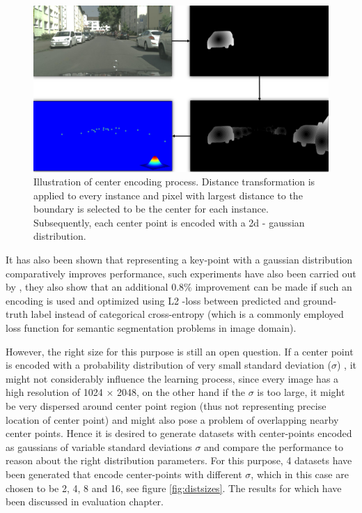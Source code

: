 \begin{figure}[!ht]
    \includegraphics[width = \textwidth]{Graphics/Data_Representation/dist_centerpoints.pdf}
    \caption[Center Encoding Process]{Illustration of center encoding process. Distance transformation is applied to every instance and pixel with largest distance to the boundary is selected to be the center for each instance. Subsequently, each center point is encoded with a 2d - gaussian distribution.}
    \label{fig:centerpoints}
\end{figure}

It has also been shown that representing a key-point with a gaussian distribution comparatively improves performance, such experiments have also been carried out by \cite{Cheng_2020_CVPR}, they also show that an additional $0.8\%$ improvement can be made if such an encoding is used and optimized using L2 -loss between predicted and ground-truth label instead of categorical cross-entropy (which is a commonly employed loss function for semantic segmentation problems in image domain). 

However, the right size for this purpose is still an open question. If a center point is encoded with a probability distribution of very small standard deviation ($\sigma$) , it might not considerably influence the learning process, since every image has a high resolution of 1024 $\times$ 2048, on the other hand if the $\sigma$ is too large, it might be very dispersed around center point region (thus not representing precise location of center point) and might also pose a problem of overlapping nearby center points. Hence it is desired to generate datasets with center-points encoded as gaussians of variable standard deviations $\sigma$ and compare the performance to reason about the right distribution parameters. For this purpose, 4 datasets have been generated that encode center-points with different $\sigma$, which in this case are chosen to be 2, 4, 8 and 16, see figure \ref{fig:distsizes}. The results for which have been discussed in evaluation chapter.

